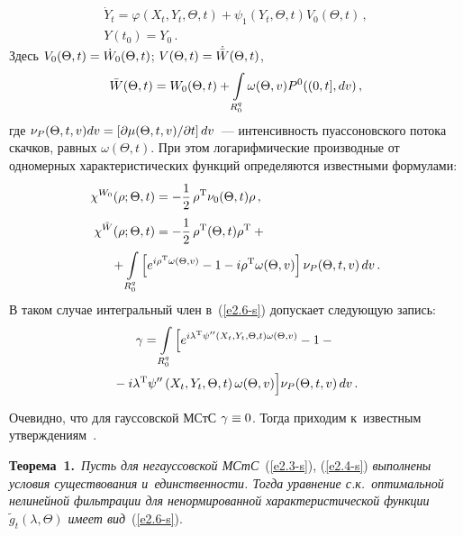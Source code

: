 \begin{multicols}{2}
\noindent
\begin{multline}
\dot Y_t = \varphi\left(X_t, Y_t, \Theta, t\right)+\psi_1 
\left(Y_t, \Theta, t\right) V_0 (\Theta, t)\,,\\ 
Y\left(t_0\right) = Y_0\,.
\label{e2.9-s}
\end{multline}
Здесь
$V_0 (\Theta, t) \hm=\dot W_0 (\Theta, t)$; $V (\Theta, t)\hm=\dot{\bar W}  (\Theta, t)$,
\begin{equation*}
\bar W (\Theta, t) = W_0  (\Theta, t)+ \int\limits_{R_0^q} \omega 
(\Theta, v) P^0 ((0,t],dv)\,,
\end{equation*}
где $\nu_P  (\Theta, t,v) dv\hm= \lk \prt \mu  (\Theta, t,v)/\prt t\rk dv$~--- 
интенсивность пуассоновского потока скачков, равных $\omega (\Theta, t)$.
При этом логарифмические производные от одномерных характеристических
 функций определяются известными формулами:
\begin{align*}
\chi^{W_0} (\rho; \Theta, t)& = -\fr{1}{2}\, \rho^{\mathrm{T}} 
    \nu_0  (\Theta, t) \rho\,,
\\
    \chi^{\bar W} (\rho;\Theta,t) &= - \fr{1}{2}\, \rho^{\mathrm{T}}  
    (\Theta, t) \rho^{\mathrm{T}}+ {}\\
    &\hspace*{-35pt}{}+\iii_{R_0^q} \left[ e^{i\rho^{\mathrm{T}} \omega 
    (\Theta, v)} -1- i\rho^{\mathrm{T}} \omega 
    (\Theta, v)\right] \nu_P  (\Theta, t,v)\,dv\,.
    \end{align*}
В таком случае интегральный член в~(\ref{e2.6-s}) допускает следующую запись:
\begin{multline}
    \gamma = \int\limits_{R_0^q} \Big[ e^{ i\lambda^{\mathrm{T}} \psi'' 
    \left(X_t, Y_t, \Theta, t\right)\omega(\Theta, v)} - 1- {}\\
    {}-i\lambda^{\mathrm{T}} 
    \psi'' \left(X_t, Y_t, \Theta, t\right)\omega 
    (\Theta, v)\Big]\nu_P  (\Theta, t,v)\,dv\,.
    \label{e2.12-s}
    \end{multline}

Очевидно, что для гауссовской МСтС $\gamma \hm\equiv 0$. Тогда приходим к~известным 
утверждениям~\cite{6-s, 8-s, 10-s}.

\smallskip

\noindent
\textbf{Теорема~1.}\ \textit{Пусть для негауссовской МСтС}~(\ref{e2.3-s}), 
(\ref{e2.4-s}) \textit{выполнены условия существования и~един\-ст\-вен\-ности.  Тогда 
уравнение с.к.\ оптимальной нелинейной фильт\-ра\-ции для ненормированной 
характеристической функции $\tilde{g}_t (\lambda, \Theta)$ имеет вид}~(\ref{e2.6-s}).



\end{multicols}
